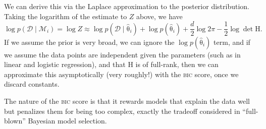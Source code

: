 \documentclass{article}
\newcommand{\acro}[1]{\textsc{\MakeLowercase{#1}}}
\newcommand{\given}{\mid}
\newcommand{\mc}[1]{\mathcal{#1}}
\newcommand{\data}{\mc{D}}
\newcommand{\model}{\mc{M}}
\newcommand{\mat}[1]{\bm{\mathrm{#1}}}
\renewcommand{\vec}[1]{\bm{\mathrm{#1}}}
\begin{document}
We can derive this via the Laplace approximation to the posterior
distribution.  Taking the logarithm of the estimate to $Z$ above, we
have
\begin{equation*}
  \textstyle
  \log p(\data \given \model_i)
  =
  \log Z
  \approx
  \log p(\data \given \hat{\vec{\theta}}_i)
  +
  \log p(\hat{\vec{\theta}}_i)
  +
  \frac{d}{2} \log 2\pi
  -
  \frac{1}{2} \log \det \mat{H}.
\end{equation*}
If we assume the prior is very broad, we can ignore the $\log
p(\hat{\vec{\theta}}_i)$ term, and if we assume the data points are
independent given the parameters (such as in linear and logistic
regression), and that $\mat{H}$ is of full-rank, then we can
approximate this asymptotically (very roughly!) with the \acro{BIC}
score, once we discard constants.

The nature of the \acro{BIC} score is that it rewards models that
explain the data well but penalizes them for being too complex,
exactly the tradeoff considered in ``full-blown'' Bayesian model
selection.
\end{document}
